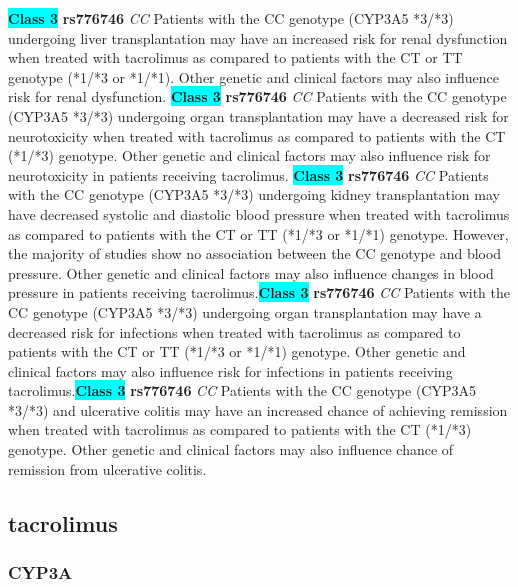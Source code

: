 \documentclass{book}
\begin{document}
\begin{center}
\textbf{\colorbox{cyan} {Class 3}} \textbf{ rs776746 } \textit{ CC }
Patients with the CC genotype (CYP3A5 *3/*3) undergoing liver transplantation may have an increased risk for renal dysfunction when treated with tacrolimus as compared to patients with the CT or TT genotype (*1/*3 or *1/*1). Other genetic and clinical factors may also influence risk for renal dysfunction. \textbf{\colorbox{cyan} {Class 3}} \textbf{ rs776746 } \textit{ CC }
Patients with the CC genotype (CYP3A5 *3/*3) undergoing organ transplantation may have a decreased risk for neurotoxicity when treated with tacrolimus as compared to patients with the CT (*1/*3) genotype. Other genetic and clinical factors may also influence risk for neurotoxicity in patients receiving tacrolimus. \textbf{\colorbox{cyan} {Class 3}} \textbf{ rs776746 } \textit{ CC }
Patients with the CC genotype (CYP3A5 *3/*3) undergoing kidney transplantation may have decreased systolic and diastolic blood pressure when treated with tacrolimus as compared to patients with the CT or TT (*1/*3 or *1/*1) genotype. However, the majority of studies show no association between the CC genotype and blood pressure. Other genetic and clinical factors may also influence changes in blood pressure in patients receiving tacrolimus.\textbf{\colorbox{cyan} {Class 3}} \textbf{ rs776746 } \textit{ CC }
Patients with the CC genotype (CYP3A5 *3/*3) undergoing organ transplantation may have a decreased risk for infections when treated with tacrolimus as compared to patients with the CT or TT (*1/*3 or *1/*1) genotype. Other genetic and clinical factors may also influence risk for infections in patients receiving tacrolimus.\textbf{\colorbox{cyan} {Class 3}} \textbf{ rs776746 } \textit{ CC }
Patients with the CC genotype (CYP3A5 *3/*3) and ulcerative colitis may have an increased chance of achieving remission when treated with tacrolimus as compared to patients with the CT (*1/*3) genotype. Other genetic and clinical factors may also influence chance of remission from ulcerative colitis. 


\end{center}\subsection{ tacrolimus }


\subsubsection{ CYP3A }
\end{document}
